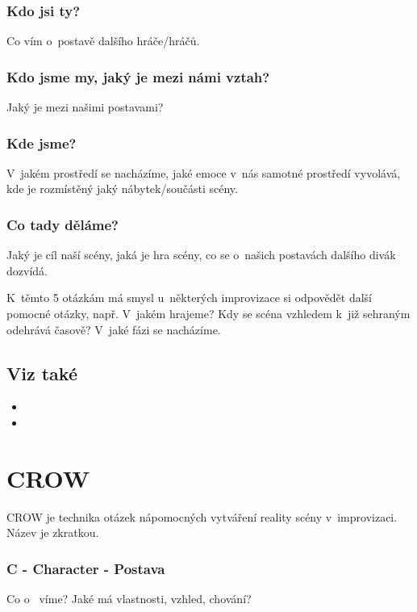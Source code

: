 \subsubsection{ Kdo jsi ty? } Co vím o~postavě dalšího hráče/hráčů. 
\subsubsection{ Kdo jsme my, jaký je mezi námi vztah? } Jaký je  mezi našimi postavami?  
\subsubsection{ Kde jsme? } V~jakém prostředí se nacházíme, jaké emoce v~nás samotné prostředí vyvolává, kde je rozmístěný jaký nábytek/součásti scény. 
\subsubsection{ Co tady děláme? } Jaký je cíl naší scény, jaká je hra scény, co se o~našich postavách dalšího divák dozvídá. 
 
 
 
K~těmto 5 otázkám má smysl u~některých  improvizace si odpovědět další pomocné otázky, např. V~jakém  hrajeme? Kdy se scéna vzhledem k~již sehraným odehrává časově? V~jaké fázi  se nacházíme. 
 
\subsection{ Viz také } \begin{itemize}
\item  {}
\item  {}
\end{itemize}
 
 
 
\needspace{5cm} \section{CROW} \label{crow} CROW je technika otázek nápomocných  vytváření reality scény v~improvizaci. Název je zkratkou. 
 
\subsubsection{ C - Character - Postava } Co o~ víme? Jaké má vlastnosti, vzhled, chování?  
 
